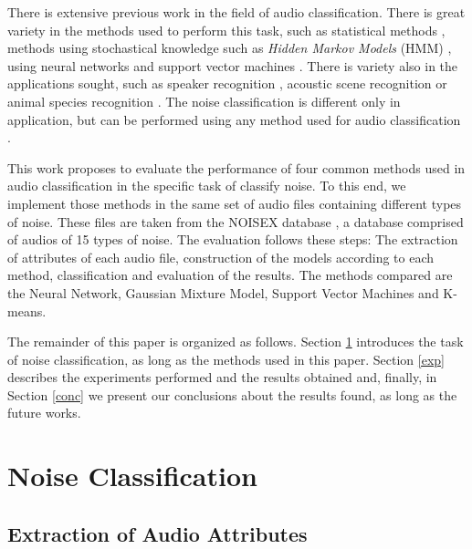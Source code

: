 \documentclass[12pt]{article}
\begin{document}
There is extensive previous work in the field of audio classification. There is great variety in the methods used to perform this task, such as statistical methods \cite{dal1988acoustic,peltonen2002computational}, methods using stochastical knowledge such as \textit{Hidden Markov Models} (HMM) \cite{ma2003context}, using neural networks \cite{beritelli2005adaptive} and support vector machines \cite{cumani2012analysis}. There is variety also in the applications sought, such as speaker recognition \cite{kinnunen2010overview,murty2006combining,farrell1994speaker}, acoustic scene recognition \cite{piczak2015environmental,barchiesi2015acoustic} or animal species recognition \cite{somervuo2006parametric,lee2008automatic}. The noise classification is different only in application, but can be performed using any method used for audio classification \cite{beritelli2007adaptive,ma2006acoustic}.

This work proposes to evaluate the performance of four common methods used in audio classification in the specific task of classify noise. To this end, we implement those methods in the same set of audio files containing different types of noise. These files are taken from the NOISEX database \cite{varga1993assessment}, a database comprised of audios of 15 types of noise. The evaluation follows these steps: The extraction of attributes of each audio file, construction of the models according to each method, classification and evaluation of the results. The methods compared are the Neural Network, Gaussian Mixture Model, Support Vector Machines and K-means.

The remainder of this paper is organized as follows. Section \ref{class} introduces the task of noise classification, as long as the methods used in this paper. Section \ref{exp} describes the experiments performed and the results obtained and, finally, in Section \ref{conc} we present our conclusions about the results found, as long as the future works.

\section{Noise Classification} \label{class}



\subsection{Extraction of Audio Attributes} \label{class:audioatt}
\end{document}
